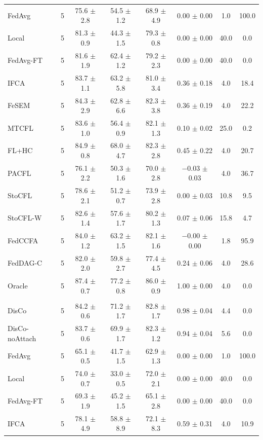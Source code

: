 {\begin{tabular}{l r c c c c c c}
FedAvg & 5 & 75.6 $\pm$ 2.8 & 54.5 $\pm$ 1.2 & 68.9 $\pm$ 4.9 & 0.00 $\pm$ 0.00 & 1.0 & 100.0 \\
Local & 5 & 81.3 $\pm$ 0.9 & 44.3 $\pm$ 1.5 & 79.3 $\pm$ 0.8 & 0.00 $\pm$ 0.00 & 40.0 & 0.0 \\
FedAvg-FT & 5 & 81.6 $\pm$ 1.9 & 62.4 $\pm$ 1.2 & 79.2 $\pm$ 2.3 & 0.00 $\pm$ 0.00 & 40.0 & 0.0 \\
IFCA & 5 & 83.7 $\pm$ 1.1 & 63.2 $\pm$ 5.8 & 81.0 $\pm$ 3.4 & 0.36 $\pm$ 0.18 & 4.0 & 18.4 \\
FeSEM & 5 & 84.3 $\pm$ 2.9 & 62.8 $\pm$ 6.6 & 82.3 $\pm$ 3.8 & 0.36 $\pm$ 0.19 & 4.0 & 22.2 \\
MTCFL & 5 & 83.6 $\pm$ 1.0 & 56.4 $\pm$ 0.9 & 82.1 $\pm$ 1.3 & 0.10 $\pm$ 0.02 & 25.0 & 0.2 \\
FL+HC & 5 & 84.9 $\pm$ 0.8 & 68.0 $\pm$ 4.7 & 82.3 $\pm$ 2.8 & 0.45 $\pm$ 0.22 & 4.0 & 20.7 \\
PACFL & 5 & 76.1 $\pm$ 2.2 & 50.3 $\pm$ 1.6 & 70.0 $\pm$ 2.8 & $-$0.03 $\pm$ 0.03 & 4.0 & 36.7 \\
StoCFL & 5 & 78.6 $\pm$ 2.1 & 51.2 $\pm$ 0.7 & 73.9 $\pm$ 2.8 & 0.00 $\pm$ 0.03 & 10.8 & 9.5 \\
StoCFL-W & 5 & 82.6 $\pm$ 1.4 & 57.6 $\pm$ 1.7 & 80.2 $\pm$ 1.3 & 0.07 $\pm$ 0.06 & 15.8 & 4.7 \\
FedCCFA & 5 & 84.0 $\pm$ 1.2 & 63.2 $\pm$ 1.5 & 82.1 $\pm$ 1.6 & $-$0.00 $\pm$ 0.00 & 1.8 & 95.9 \\
FedDAG-C & 5 & 82.0 $\pm$ 2.0 & 59.8 $\pm$ 2.7 & 77.4 $\pm$ 4.5 & 0.24 $\pm$ 0.06 & 4.0 & 28.6 \\
Oracle & 5 & 87.4 $\pm$ 0.7 & 77.2 $\pm$ 0.8 & 86.0 $\pm$ 0.9 & 1.00 $\pm$ 0.00 & 4.0 & 0.0 \\
\addlinespace
\multicolumn{8}{l}{\textit{EMNIST rotation}} \\
DisCo & 5 & 84.2 $\pm$ 0.6 & 71.2 $\pm$ 1.7 & 82.8 $\pm$ 1.7 & 0.98 $\pm$ 0.04 & 4.4 & 0.0 \\
DisCo-noAttach & 5 & 83.7 $\pm$ 0.6 & 69.9 $\pm$ 1.7 & 82.3 $\pm$ 1.2 & 0.94 $\pm$ 0.04 & 5.6 & 0.0 \\
FedAvg & 5 & 65.1 $\pm$ 0.5 & 41.7 $\pm$ 1.5 & 62.9 $\pm$ 1.3 & 0.00 $\pm$ 0.00 & 1.0 & 100.0 \\
Local & 5 & 74.0 $\pm$ 0.7 & 33.0 $\pm$ 0.5 & 72.0 $\pm$ 2.1 & 0.00 $\pm$ 0.00 & 40.0 & 0.0 \\
FedAvg-FT & 5 & 69.3 $\pm$ 1.9 & 45.2 $\pm$ 1.5 & 65.1 $\pm$ 2.8 & 0.00 $\pm$ 0.00 & 40.0 & 0.0 \\
IFCA & 5 & 78.1 $\pm$ 4.9 & 58.8 $\pm$ 8.9 & 72.1 $\pm$ 8.3 & 0.59 $\pm$ 0.31 & 4.0 & 10.9 \\

\end{tabular}}
